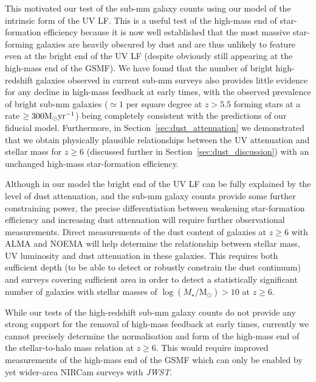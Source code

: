 \documentclass[fleqn,usenatbib]{mnras}
\begin{document}
This motivated our test of the sub-mm galaxy counts using our model of the intrinsic form of the UV LF. This is a useful test of the high-mass end of star-formation efficiency because it is now well established that the most massive star-forming galaxies are heavily obscured by dust and are thus unlikely to feature even at the bright end of the UV LF (despite obviously still appearing at the high-mass end of the GSMF). We have found that the number of bright high-redshift galaxies observed in current sub-mm surveys \citep[e.g.][]{simpson2019,mckinney2024} also provides little evidence for any decline in high-mass feedback at early times, with the observed prevalence of bright sub-mm galaxies ($\simeq 1$ per square degree at $z > 5.5$ forming stars at a rate $\ge 300 {\rm M_{\odot} yr^{-1}}$) being completely consistent with the predictions of our fiducial model. Furthermore, in Section~\ref{sec:dust_attenuation} we demonstrated that we obtain physically plausible relationships between the UV attenuation and stellar mass for $z\geq6$ (discussed further in Section~\ref{sec:dust_discussion}) with an unchanged high-mass star-formation efficiency. 

Although in our model the bright end of the UV LF can be fully explained by the level of dust attenuation, and the sub-mm galaxy counts provide some further constraining power, the precise differentiation between weakening star-formation efficiency and increasing dust attenuation will require further observational measurements. Direct measurements of the dust content of galaxies at $z\geq6$ with ALMA and NOEMA will help determine the relationship between stellar mass, UV luminosity and dust attenuation in these galaxies. This requires both sufficient depth (to be able to detect or robustly constrain the dust continuum) and surveys covering sufficient area in order to detect a statistically significant number of galaxies with stellar masses of $\log(M_{\star}/ \mathrm{M_{\odot}})>10$ at $z\geq6$.

While our tests of the high-redshift sub-mm galaxy counts do not provide any strong support for the removal of high-mass feedback at early times, currently we cannot precisely determine the normalisation and form of the high-mass end of the stellar-to-halo mass relation at $z\geq6$. This would require improved measurements of the high-mass end of the GSMF which can only be enabled by yet wider-area NIRCam surveys with \textit{JWST}. 
\end{document}
